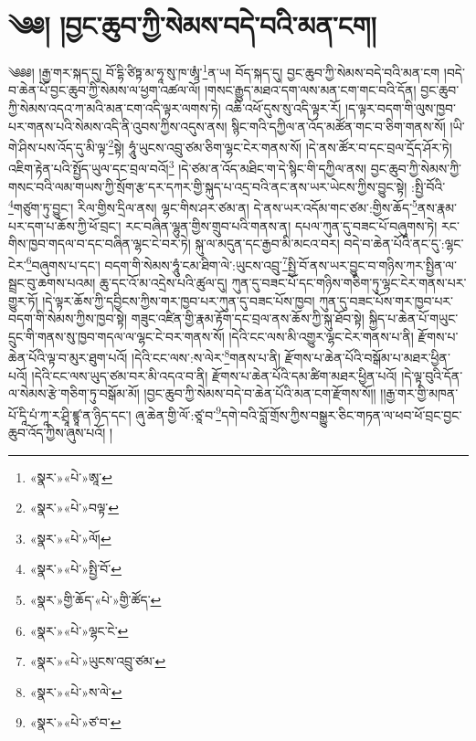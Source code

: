 \chapter{༄༅། །བྱང་ཆུབ་ཀྱི་སེམས་བདེ་བའི་མན་ངག།}༄༅༅། །རྒྱ་གར་སྐད་དུ། བོ་དྷི་ཙིཏྟ་མ་ཧཱ་སུ་ཁ་ཨཱཾ་\footnote{«སྣར་»«པེ་»ཨཱ་}ན་ཡ། བོད་སྐད་དུ། བྱང་ཆུབ་ཀྱི་སེམས་བདེ་བའི་མན་ངག །བདེ་བ་ཆེན་པོ་བྱང་ཆུབ་ཀྱི་སེམས་ལ་ཕྱག་འཚལ་ལོ། །གསང་རྒྱུད་མཐའ་དག་ལས་མན་ངག་གང་བའི་དོན། བྱང་ཆུབ་ཀྱི་སེམས་འདའ་ཀ་མའི་མན་ངག་འདི་ལྟར་ལགས་ཏེ། འཆི་འཕོ་དུས་སུ་འདི་ལྟར་རོ། །ད་ལྟར་བདག་གི་ལུས་ཁྱབ་པར་གནས་པའི་སེམས་འདི་ནི་འུབས་ཀྱིས་འདུས་ནས། སྙིང་གའི་དཀྱིལ་ན་འོད་མཚོན་གང་བ་ཅིག་གནས་སོ། །ཡི་གེ་ཤིས་པས་འོད་དུ་མི་ལྟ་\footnote{«སྣར་»«པེ་»བལྟ་}སྟེ། ཧཱུཾ་ཡུངས་འབྲུ་ཙམ་ཅིག་ལྷང་ངེར་གནས་སོ། །དེ་ནས་ཚོར་བ་དང་བྲལ་དྲོད་ཤོར་ཏེ། འཇིག་རྟེན་པའི་སྤྱོད་ཡུལ་དང་བྲལ་བའོ།\footnote{«སྣར་»«པེ་»ལོ།} །དེ་ཙམ་ན་འོད་མཐིང་ག་དེ་སྙིང་གི་དཀྱིལ་ནས། བྱང་ཆུབ་ཀྱི་སེམས་ཀྱི་གསང་བའི་ལམ་གཡས་ཀྱི་སྲོག་རྩ་དར་དཀར་གྱི་སྐུད་པ་འདྲ་བའི་ནང་ནས་ཡར་ཡེངས་ཀྱིས་བྱུང་སྟེ། :སྤྱི་བོའི་\footnote{«སྣར་»«པེ་»སྤྱི་བོ་}གཙུག་ཏུ་བྱུང་། རིལ་གྱིས་དྲིལ་ནས། ལྷང་གིས་ཤར་ཙམ་ན། དེ་ནས་ཡར་འདོམ་གང་ཙམ་:གྱིས་ཆོད་\footnote{«སྣར་»གྱི་ཆོད་«པེ་»གྱི་ཚོད་}ནས་རྣམ་པར་དག་པ་ཆོས་ཀྱི་ཕོ་བྲང་། རང་བཞིན་ལྷུན་གྱིས་གྲུབ་པའི་གནས་ན། དཔལ་ཀུན་དུ་བཟང་པོ་བཞུགས་ཏེ། རང་གིས་ཁྱབ་གདལ་བ་དང་བཞིན་ལྷང་ངེ་བར་ཏེ། སྐུ་ལ་མདུན་དང་རྒྱབ་མི་མངའ་བར། བདེ་བ་ཆེན་པོའི་ནང་དུ་:ལྷང་ངེར་\footnote{«སྣར་»«པེ་»ལྷང་ངེ་}བཞུགས་པ་དང་། བདག་གི་སེམས་ཧཱུཾ་ངམ་ཐིག་ལེ་:ཡུངས་འབྲུ་\footnote{«སྣར་»«པེ་»ཡུངས་འབྲུ་ཙམ་}སྤྱི་བོ་ནས་ཡར་བྱུང་བ་གཉིས་ཀར་སྤྱིན་ལ་སྦྲང་བུ་ཆགས་པའམ། ཆུ་དང་འོ་མ་འདྲེས་པའི་ཚུལ་དུ། ཀུན་དུ་བཟང་པོ་དང་གཉིས་གཅིག་ཏུ་ལྷང་ངེར་གནས་པར་གྱུར་ཏོ། །དེ་ལྟར་ཆོས་ཀྱི་དབྱིངས་ཀྱིས་གར་ཁྱབ་པར་ཀུན་དུ་བཟང་པོས་ཁྱབ། ཀུན་དུ་བཟང་པོས་གར་ཁྱབ་པར་བདག་གི་སེམས་ཀྱིས་ཁྱབ་སྟེ། གཟུང་འཛིན་གྱི་རྣམ་རྟོག་དང་བྲལ་ནས་ཆོས་ཀྱི་སྐུ་ཐོབ་སྟེ། སྐྱིད་པ་ཆེན་པོ་གཡུང་དྲུང་གི་གནས་སུ་ཁྱབ་གདལ་ལ་ལྷང་ངེ་བར་གནས་སོ། །དེའི་ངང་ལས་མི་འགྱུར་ལྷང་ངེར་གནས་པ་ནི། རྫོགས་པ་ཆེན་པོའི་ལྟ་བ་མུར་ཐུག་པའོ། །དེའི་ངང་ལས་:ས་ལེར་\footnote{«སྣར་»«པེ་»ས་ལེ་}གནས་པ་ནི། རྫོགས་པ་ཆེན་པོའི་བསྒོམ་པ་མཐར་ཕྱིན་པའོ། །དེའི་ངང་ལས་ཡུད་ཙམ་བར་མི་འདའ་བ་ནི། རྫོགས་པ་ཆེན་པོའི་དམ་ཚིག་མཐར་ཕྱིན་པའོ། །དེ་ལྟ་བུའི་དོན་ལ་སེམས་རྩེ་གཅིག་ཏུ་བསྒོམ་མོ། །བྱང་ཆུབ་ཀྱི་སེམས་བདེ་བ་ཆེན་པོའི་མན་ངག་རྫོགས་སོ།། །།རྒྱ་གར་གྱི་མཁན་པོ་དཱི་པཾ་ཀཱ་ར་ཤྲཱི་ཛྙཱ་ན་ཉིད་དང་། ཞུ་ཆེན་གྱི་ལོ་:ཙཱ་བ་\footnote{«སྣར་»«པེ་»ཙ་བ་}དགེ་བའི་བློ་གྲོས་ཀྱིས་བསྒྱུར་ཅིང་གཏན་ལ་ཕབ་ཕོ་བྲང་བྱང་ཆུབ་འོད་ཀྱིས་ཞུས་པའོ། ། 